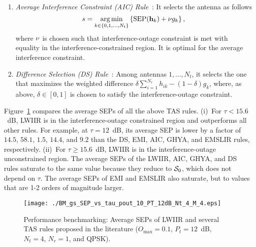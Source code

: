 \documentclass[journal]{IEEEtran}
\DeclareMathOperator*{\argmin}{arg\,min}
\newcommand{\SEP}{\text{SEP}}
\newcommand{\nx}{{0}}
\newcommand{\Nt}{{N_t}}
\newcommand{\Nr}{{N_r}}
\newcommand{\Pt}{{P_t}}
\newcommand{\such}{h}
\newcommand{\puch}{g}
\newcommand{\hk}[1]{{\such_{#1}}}
\newcommand{\gk}[1]{{\puch_{#1}}}
\newcommand{\outmax}{O_{\text{max}}}
\newcommand{\itau}{\tau}
\newcommand{\allopts}{\left\{\nx,1,\ldots,\Nt\right\}}
\newcommand{\caluncons}{{\cal S_{\text{0}}}}
\newcommand{\sumnr}{\sum_{i=1}^{\Nr}}
\newcommand{\bhk}[1]{\mathbf{\such}_{#1}}
\begin{document}
\begin{enumerate}
\item {\em Average Interference Constraint (AIC) Rule~\cite{Sarvendranath_2013_TCOM}}: It selects the antenna as follows
\begin{equation}
s = \argmin_{k\in\allopts} \left\lbrace \SEP(\bhk{k}) + \aicconst \gk{k}   \right\rbrace,
\end{equation}
where $\nu$ is chosen such that interference-outage constraint is met with equality in the interference-constrained region. It is optimal for the average interference constraint. 



\item {\em Difference Selection (DS) Rule~\cite{Wang_2011_TCom,Sarvendranath_2014_TCOM}}: Among antennas $1,\ldots,\Nt$, it selects the one that maximizes the weighted difference $\delta \sumnr\hk{ik} -(1-\delta) \gk{k} $, where, as above, $\delta \in [0, 1]$ is chosen to satisfy the interference-outage constraint.







\end{enumerate}


Figure~\ref{fig:BM_SEP_vs_tau} compares the average SEPs of all the above TAS rules. (i)~For $\itau < 15.6$~dB, LWIIR is in the interference-outage constrained region and outperforms all other rules. For example, at $\itau=12$~dB,  its average SEP is lower by a factor of $14.5$, $58.1$, $1.5$, $14.4$, and $9.2$ than the DS, EMI, AIC, GHYA, and EMSLIR  rules, respectively.  (ii)~For $\itau \geq 15.6$~dB, LWIIR is in the interference-outage unconstrained region. The average SEPs of the LWIIR, AIC, GHYA, and DS rules saturate to the same value because they reduce to  $\caluncons$, which does not depend on $\itau$. The average SEPs of EMI and EMSLIR also saturate, but to values that are 1-2 orders of magnitude larger. 



\begin{figure}
	\centering \texttt{[image: ./BM\_gs\_SEP\_vs\_tau\_pout\_10\_PT\_12dB\_Nt\_4\_M\_4.eps]}
	\caption{Performance benchmarking: Average SEPs of LWIIR and several TAS rules proposed in the literature ($\outmax = 0.1$, $\Pt = 12$~dB, $\Nt = 4$, $\Nr=1$, and QPSK).}
	\label{fig:BM_SEP_vs_tau}
\end{figure}
\end{document}

